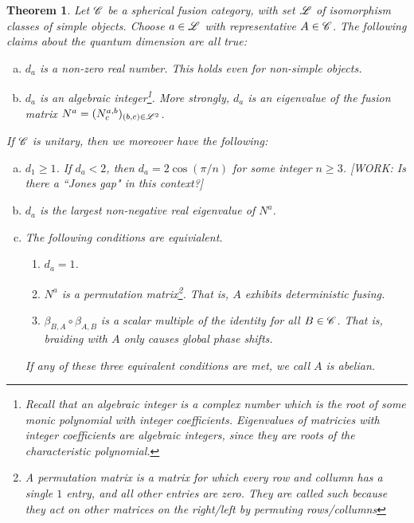 \documentclass{article}
\newtheorem{theorem}{Theorem}[section]
\theoremstyle{definition}
\numberwithin{figure}{section}
\newcounter{quantumdim}
\begin{document}
\begin{theorem}\label{quantum dimensions} Let $\mathscr{C}$ be a spherical fusion category, with set $\mathscr{L}$ of isomorphism classes of simple objects. Choose $a\in \mathscr{L}$ with representative $A\in\mathscr{C}$. The following claims about the quantum dimension are all true:

\begin{enumerate}[(a)]
\item $d_a$ is a non-zero real number. This holds even for non-simple objects.

\item $d_a$ is an algebraic integer\footnote{Recall that an \textit{algebraic integer} is a complex number which is the root of some monic polynomial with integer coefficients. Eigenvalues of matricies with integer coefficients are algebraic integers, since they are roots of the characteristic polynomial.}. More strongly, $d_a$ is an eigenvalue of the fusion matrix $N^{a}=(N^{a,b}_c)_{(b,c)\in \mathscr{L}^2}$.

\setcounter{quantumdim}{\value{enumi}}

\end{enumerate}

If $\mathscr{C}$ is unitary, then we moreover have the following:

\begin{enumerate}[(a)]
\setcounter{enumi}{\value{quantumdim}}

\item $d_1\geq 1$. If $d_a<2$, then $d_a=2\cos(\pi /n)$ for some integer $n\geq 3$.  [WORK: Is there a ``Jones gap" in this context?]

\item $d_a$ is the largest non-negative real eigenvalue of $N^a$.

\item The following conditions are equivialent.

\begin{enumerate}[1.]
\item $d_a=1$.
\item $N^a$ is a permutation matrix\footnote{A permutation matrix is a matrix for which every row and collumn has a single $1$ entry, and all other entries are zero. They are called such because they act on other matrices on the right/left by permuting rows/collumns}. That is, $A$ exhibits deterministic fusing.
\item $\beta_{B,A}\circ \beta_{A,B}$ is a scalar multiple of the identity for all $B\in \mathscr{C}$. That is, braiding with $A$ only causes global phase shifts.
\end{enumerate}

If any of these three equivalent conditions are met, we call $A$ is \textit{abelian}. 
\end{enumerate}
\end{theorem}
\end{document}
